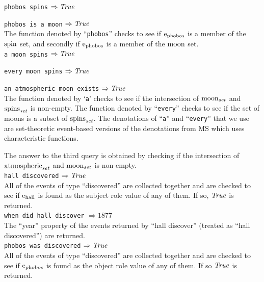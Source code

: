 \documentclass[../main.tex]{subfiles}
\begin{document}
\begin{refsection}
\texttt{phobos spins} $\Rightarrow \operatorname{\mathit{True}}$

\noindent \texttt{phobos is a moon} $\Rightarrow \operatorname{\mathit{True}}$ \\

The function denoted by ``\texttt{phobos}'' checks to see if $\mathrm{e}_{\operatorname{phobos}}$ is a member of the $\operatorname{spin}$ set, and secondly if $\mathrm{e}_{\operatorname{phobos}}$ is a member of the $\operatorname{moon}$ set. \\

\noindent \texttt{a moon spins} $\Rightarrow \operatorname{\mathit{True}}$

\noindent \texttt{every moon spins} $\Rightarrow \operatorname{\mathit{True}}$

\noindent \texttt{an atmospheric moon exists} $\Rightarrow \operatorname{\mathit{True}}$ \\

The function denoted by `\texttt{a}' checks to see if the intersection of $\operatorname{moon}_{\operatorname{\mathit{set}}}$ and $\operatorname{spins}_{\operatorname{\mathit{set}}}$ is non-empty. The function denoted by ``\texttt{every}'' checks to see if the set of moons is a subset of $\operatorname{spins}_{\operatorname{\mathit{set}}}$. The denotations of ``\texttt{a}'' and ``\texttt{every}'' that we use are set-theoretic event-based versions of the denotations from MS which uses characteristic functions.

The answer to the third query is obtained by checking if the intersection of $\operatorname{atmospheric}_{\operatorname{\mathit{set}}}$ and $\operatorname{moon}_{\operatorname{\mathit{set}}}$ is non-empty. \\

\noindent \texttt{hall discovered} $\Rightarrow \operatorname{\mathit{True}}$ \\

All of the events of type ``discovered'' are collected together and are checked to see if $\mathrm{e}_{\operatorname{hall}}$ is found as the subject role value of any of them. If so, $\operatorname{\mathit{True}}$ is returned. \\

\noindent \texttt{when did hall discover} $\Rightarrow 1877$ \\

The ``year'' property of the  events returned by ``hall discover'' (treated as ``hall discovered'') are returned. \\

\noindent \texttt{phobos was discovered} $\Rightarrow \operatorname{\mathit{True}}$ \\

All of the events of type ``discovered'' are collected together and are checked to see if $\mathrm{e}_{\operatorname{phobos}}$ is found as the object role value of any of them. If so $\operatorname{\mathit{True}}$ is returned. \\\


\end{refsection}
\end{document}
